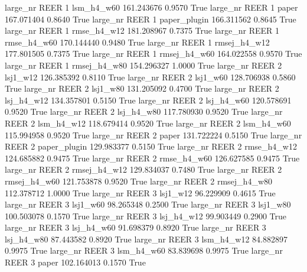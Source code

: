   large_nr     REER                 1   lsm_h4_w60  161.243676      0.9570    True
  large_nr     REER                 1        paper  167.071404      0.8640    True
  large_nr     REER                 1 paper_plugin  166.311562      0.8645    True
  large_nr     REER                 1  rmse_h4_w12  181.208967      0.7375    True
  large_nr     REER                 1  rmse_h4_w60  170.144440      0.9480    True
  large_nr     REER                 1 rmsej_h4_w12  177.801505      0.7375    True
  large_nr     REER                 1 rmsej_h4_w60  164.022558      0.9570    True
  large_nr     REER                 1 rmsej_h4_w80  154.296327      1.0000    True
  large_nr     REER                 2     lsj1_w12  126.385392      0.8110    True
  large_nr     REER                 2     lsj1_w60  128.706938      0.5860    True
  large_nr     REER                 2     lsj1_w80  131.205092      0.4700    True
  large_nr     REER                 2   lsj_h4_w12  134.357801      0.5150    True
  large_nr     REER                 2   lsj_h4_w60  120.578691      0.9520    True
  large_nr     REER                 2   lsj_h4_w80  117.780930      0.9520    True
  large_nr     REER                 2   lsm_h4_w12  118.679414      0.9520    True
  large_nr     REER                 2   lsm_h4_w60  115.994958      0.9520    True
  large_nr     REER                 2        paper  131.722224      0.5150    True
  large_nr     REER                 2 paper_plugin  129.983377      0.5150    True
  large_nr     REER                 2  rmse_h4_w12  124.685882      0.9475    True
  large_nr     REER                 2  rmse_h4_w60  126.627585      0.9475    True
  large_nr     REER                 2 rmsej_h4_w12  129.834037      0.7480    True
  large_nr     REER                 2 rmsej_h4_w60  121.753878      0.9520    True
  large_nr     REER                 2 rmsej_h4_w80  112.378712      1.0000    True
  large_nr     REER                 3     lsj1_w12   96.229909      0.4615    True
  large_nr     REER                 3     lsj1_w60   98.265348      0.2500    True
  large_nr     REER                 3     lsj1_w80  100.503078      0.1570    True
  large_nr     REER                 3   lsj_h4_w12   99.903449      0.2900    True
  large_nr     REER                 3   lsj_h4_w60   91.698379      0.8920    True
  large_nr     REER                 3   lsj_h4_w80   87.443582      0.8920    True
  large_nr     REER                 3   lsm_h4_w12   84.882897      0.9975    True
  large_nr     REER                 3   lsm_h4_w60   83.839698      0.9975    True
  large_nr     REER                 3        paper  102.164013      0.1570    True
